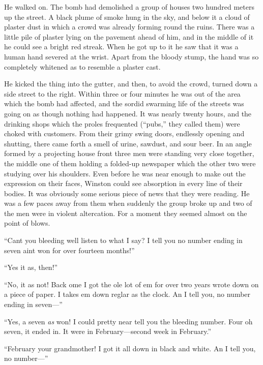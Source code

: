 He walked on. The bomb had demolished a group of houses two hundred
meters up the street. A black plume of smoke hung in the sky, and below
it a cloud of plaster dust in which a crowd was already forming round
the ruins. There was a little pile of plaster lying on the pavement
ahead of him, and in the middle of it he could see a bright red streak.
When he got up to it he saw that it was a human hand severed at the
wrist. Apart from the bloody stump, the hand was so completely whitened
as to resemble a plaster cast.

He kicked the thing into the gutter, and then, to avoid the crowd,
turned down a side street to the right. Within three or four minutes he
was out of the area which the bomb had affected, and the sordid swarming
life of the streets was going on as though nothing had happened. It was
nearly twenty hours, and the drinking shops which the proles frequented
(``pubs,'' they called them) were choked with customers. From their grimy
swing doors, endlessly opening and shutting, there came forth a smell of
urine, sawdust, and sour beer. In an angle formed by a projecting house
front three men were standing very close together, the middle one of
them holding a folded-up newspaper which the other two were studying
over his shoulders. Even before he was near enough to make out the
expression on their faces, Winston could see absorption in every line of
their bodies. It was obviously some serious piece of news that they were
reading. He was a few paces away from them when suddenly the group broke
up and two of the men were in violent altercation. For a moment they
seemed almost on the point of blows.

``Can\textquotesingle t you bleeding well listen to what I say? I tell
you no number ending in seven ain\textquotesingle t won for over
fourteen months!''

``Yes it \textquotesingle as, then!''

``No, it \textquotesingle as not! Back \textquotesingle ome I got the
\textquotesingle ole lot of \textquotesingle em for over two years wrote
down on a piece of paper. I takes \textquotesingle em down
reg\textquotesingle lar as the clock. An\textquotesingle{} I tell you,
no number ending in seven---''

``Yes, a seven \emph{\textquotesingle as} won! I could pretty near tell
you the bleeding number. Four oh seven, it ended in. It were in
February---second week in February.''

``February your grandmother! I got it all down in black and white.
An\textquotesingle{} I tell you, no number---''


